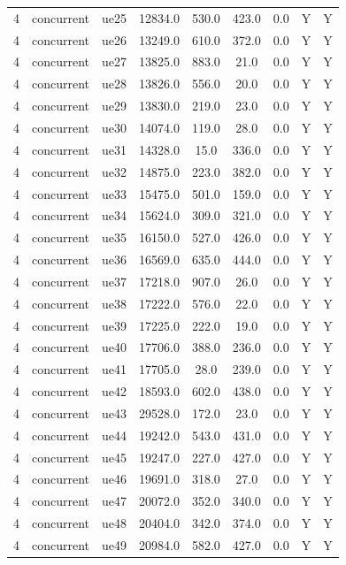\begin{table}[ht]
\begin{tabular}{|c|c|c|c|c|c|c|c|c|}
4 & concurrent & ue25 & 12834.0 & 530.0 & 423.0 & 0.0 & Y & Y \\
4 & concurrent & ue26 & 13249.0 & 610.0 & 372.0 & 0.0 & Y & Y \\
4 & concurrent & ue27 & 13825.0 & 883.0 & 21.0 & 0.0 & Y & Y \\
4 & concurrent & ue28 & 13826.0 & 556.0 & 20.0 & 0.0 & Y & Y \\
4 & concurrent & ue29 & 13830.0 & 219.0 & 23.0 & 0.0 & Y & Y \\
4 & concurrent & ue30 & 14074.0 & 119.0 & 28.0 & 0.0 & Y & Y \\
4 & concurrent & ue31 & 14328.0 & 15.0 & 336.0 & 0.0 & Y & Y \\
4 & concurrent & ue32 & 14875.0 & 223.0 & 382.0 & 0.0 & Y & Y \\
4 & concurrent & ue33 & 15475.0 & 501.0 & 159.0 & 0.0 & Y & Y \\
4 & concurrent & ue34 & 15624.0 & 309.0 & 321.0 & 0.0 & Y & Y \\
4 & concurrent & ue35 & 16150.0 & 527.0 & 426.0 & 0.0 & Y & Y \\
4 & concurrent & ue36 & 16569.0 & 635.0 & 444.0 & 0.0 & Y & Y \\
4 & concurrent & ue37 & 17218.0 & 907.0 & 26.0 & 0.0 & Y & Y \\
4 & concurrent & ue38 & 17222.0 & 576.0 & 22.0 & 0.0 & Y & Y \\
4 & concurrent & ue39 & 17225.0 & 222.0 & 19.0 & 0.0 & Y & Y \\
4 & concurrent & ue40 & 17706.0 & 388.0 & 236.0 & 0.0 & Y & Y \\
4 & concurrent & ue41 & 17705.0 & 28.0 & 239.0 & 0.0 & Y & Y \\
4 & concurrent & ue42 & 18593.0 & 602.0 & 438.0 & 0.0 & Y & Y \\
4 & concurrent & ue43 & 29528.0 & 172.0 & 23.0 & 0.0 & Y & Y \\
4 & concurrent & ue44 & 19242.0 & 543.0 & 431.0 & 0.0 & Y & Y \\
4 & concurrent & ue45 & 19247.0 & 227.0 & 427.0 & 0.0 & Y & Y \\
4 & concurrent & ue46 & 19691.0 & 318.0 & 27.0 & 0.0 & Y & Y \\
4 & concurrent & ue47 & 20072.0 & 352.0 & 340.0 & 0.0 & Y & Y \\
4 & concurrent & ue48 & 20404.0 & 342.0 & 374.0 & 0.0 & Y & Y \\
4 & concurrent & ue49 & 20984.0 & 582.0 & 427.0 & 0.0 & Y & Y \\

\end{tabular}
\end{table}
